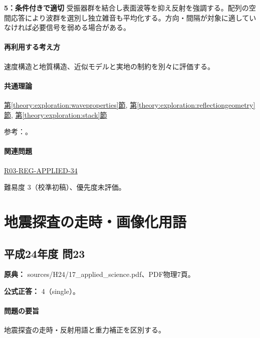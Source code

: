 \noindent\textbf{5：条件付きで適切} 受振器群を結合し表面波等を抑え反射を強調する。配列の空間応答により波群を選別し独立雑音も平均化する。方向・間隔が対象に適していなければ必要信号を弱める場合がある。\par

\paragraph{再利用する考え方} 速度構造と地質構造、近似モデルと実地の制約を別々に評価する。

\paragraph{共通理論} \hyperref[theory:exploration:waveproperties]{第\ref*{theory:exploration:waveproperties}節}, \hyperref[theory:exploration:reflectiongeometry]{第\ref*{theory:exploration:reflectiongeometry}節}, \hyperref[theory:exploration:stack]{第\ref*{theory:exploration:stack}節}

\par 参考：\cite{segj_integrated2017,jica_refraction2015,usgs_processing2000,epa_seismic_reflection}。

\paragraph{関連問題} \hyperref[q:r03-reg-applied-34]{R03-REG-APPLIED-34}

\par 難易度 3（校準初稿）、優先度未評価。

\section{地震探査の走時・画像化用語}

\subsection{平成24年度 問23}
\label{q:h24-reg-applied-23}

\noindent\textbf{原典：} sources/H24/17\_applied\_science.pdf、PDF物理7頁。

\textbf{公式正答：} 4（single）。

\paragraph{問題の要旨} 地震探査の走時・反射用語と重力補正を区別する。

